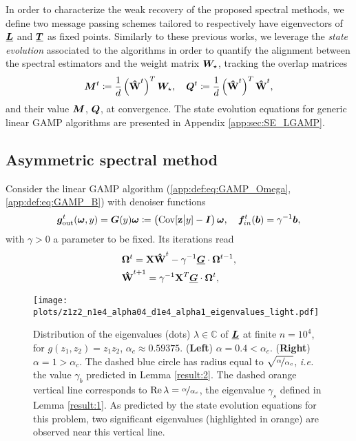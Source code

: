 In order to characterize the weak recovery of the proposed spectral methods, we define two message passing schemes tailored to respectively have eigenvectors of ${\underline{\bm{L}}}$ and ${\underline{\bm{T}}}$ as fixed points. Similarly to these previous works, we leverage the \textit{state evolution} associated to the algorithms in order to quantify the alignment between the spectral estimators and the weight matrix $\bm{W}_\star$, tracking the overlap matrices
\begin{equation}\label{eq:def:overlaps_amp}
    \bm{M}^t \coloneqq \frac{1}{d}\left(\boldsymbol{\mathbf{\hat{W}}}^t\right)^T{\boldsymbol W}_\star,\quad\bm{Q}^t\coloneqq \frac{1}{d}\left(\boldsymbol{\mathbf{\hat{W}}}^t\right)^T\boldsymbol{\mathbf{\hat{W}}}^t,
\end{equation}
and their value ${\boldsymbol M}$, ${\boldsymbol Q}$, at convergence. The state evolution equations for generic linear GAMP algorithms are presented in Appendix \ref{app:sec:SE_LGAMP}.
\subsection{Asymmetric spectral method}
\begin{definition}\label{def:sp_GAMP_asymm}
Consider the linear GAMP algorithm (\ref{app:def:eq:GAMP_Omega},\ref{app:def:eq:GAMP_B}) with denoiser functions
\begin{equation}
    {\boldsymbol g}_{\rm out}^t(\boldsymbol{\omega},y) ={\boldsymbol G}(y)\boldsymbol{\omega}\coloneqq\left(\mathrm{Cov}[\boldsymbol{\mathbf{z}}\big|y]-{\boldsymbol I}\right)\boldsymbol{\omega},\quad\boldsymbol{f}_{in}^t(\bm{b}) = \gamma^{-1}\bm{b},
\end{equation}
with $\gamma > 0$ a parameter to be fixed. Its iterations read
\begin{align}\label{eq:def:sp_GAMP_Omega}
    &\boldsymbol{\Omega}^{t} =\boldsymbol{\mathbf{X}}\boldsymbol{\mathbf{\hat{W}}}^t - \gamma^{-1}{\underline{\bm{G}}}\cdot\boldsymbol{\Omega}^{t-1},\\
    &\boldsymbol{\mathbf{\hat{W}}}^{t+1} = \gamma^{-1}\boldsymbol{\mathbf{X}}^T{\underline{\bm{G}}}\cdot\boldsymbol{\Omega}^t,\label{eq:est:gamp}
\end{align}
\end{definition}

\begin{figure*}[t]
    \centering
    \texttt{[image: plots/z1z2\_n1e4\_alpha04\_d1e4\_alpha1\_eigenvalues\_light.pdf]}
    \caption{Distribution of the eigenvalues (dots) $\lambda\in\mathbb C$ of ${\underline{\bm{L}}}$ at finite $n = 10^4$, for $g(z_1,z_2) = z_1z_2$,  $\alpha_c \approx 0.59375$. (\textbf{Left}) $\alpha = 0.4 < \alpha_c$. (\textbf{Right}) $\alpha = 1 > \alpha_c$. The dashed blue circle has radius equal to $\sqrt{\nicefrac{\alpha}{\alpha_c}}$, {\it i.e.} the value $\gamma_b$ predicted in Lemma \ref{result:2}. The dashed orange vertical line corresponds to $\operatorname{Re}\lambda = \nicefrac{\alpha}{\alpha_c}$, the eigenvalue $\gamma_s$ defined in Lemma \ref{result:1}. As predicted by the state evolution equations for this problem, two significant eigenvalues (highlighted in orange) are observed near this vertical line.}
    \label{fig:eigenvalues_product_p2}
\end{figure*}

